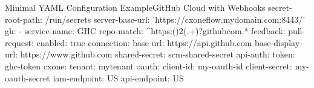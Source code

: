 \begin{code}{Minimal YAML Configuration Example}{GitHub Cloud with Webhooks}{}
secret-root-path: /run/secrets
server-base-url: 'https://cxoneflow.mydomain.com:8443/'
gh:
  - service-name: GHC
    repo-match: ^https:(\/){2}(.+\.)?github\.com.*
    feedback:
      pull-request:
        enabled: true
    connection:
      base-url: https://api.github.com
      base-display-url: https://www.github.com
      shared-secret: scm-shared-secret
      api-auth:
        token: ghc-token
    cxone:
      tenant: mytenant
      oauth:
        client-id: my-oauth-id
        client-secret: my-oauth-secret
      iam-endpoint: US
      api-endpoint: US
\end{code}
  